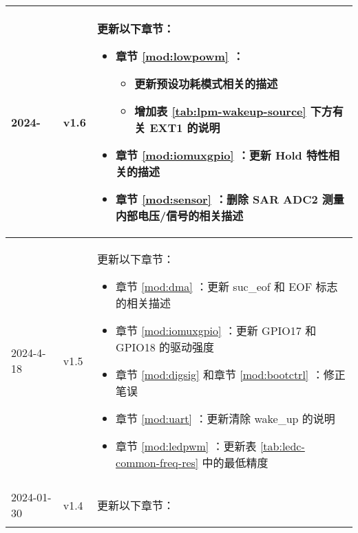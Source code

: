 \begin{longtable}[l]{ | m{2cm} | m{1.5cm} | m{12cm} | }
    2024- & v1.6 &
    更新以下章节：
        \begin{itemize}
            \item 章节 \ref{mod:lowpowm} \textit{\nameref{mod:lowpowm}}：
                \begin{itemize}
                \item 更新预设功耗模式相关的描述 %
                \item 增加表 \ref{tab:lpm-wakeup-source} 下方有关 EXT1 的说明 %
                \end{itemize}
            \item 章节 \ref{mod:iomuxgpio} \textit{\nameref{mod:iomuxgpio}}：更新 Hold 特性相关的描述 %
            \item 章节 \ref{mod:sensor} \textit{\nameref{mod:sensor}}：删除 SAR ADC2 测量内部电压/信号的相关描述 %
        \end{itemize}
    \\\hline
    2024-4-18 & v1.5 &
    更新以下章节：
        \begin{itemize}
            \item 章节 \ref{mod:dma} \textit{\nameref{mod:dma}}：更新 suc\_eof 和 EOF 标志的相关描述 %
            \item 章节 \ref{mod:iomuxgpio} \textit{\nameref{mod:iomuxgpio}}：更新 GPIO17 和 GPIO18 的驱动强度 %
            \item 章节 \ref{mod:digsig} \textit{\nameref{mod:digsig}}和章节 \ref{mod:bootctrl} \textit{\nameref{mod:bootctrl}}：修正笔误 %
            \item 章节 \ref{mod:uart} \textit{\nameref{mod:uart}}：更新清除 wake\_up 的说明 %
            \item 章节 \ref{mod:ledpwm} \textit{\nameref{mod:ledpwm}}：更新表 \ref{tab:ledc-common-freq-res} 中的最低精度  %
        \end{itemize}
    \\\hline
    2024-01-30     & v1.4  &
    更新以下章节：
    \begin{itemize}

\end{itemize}
\end{longtable}
